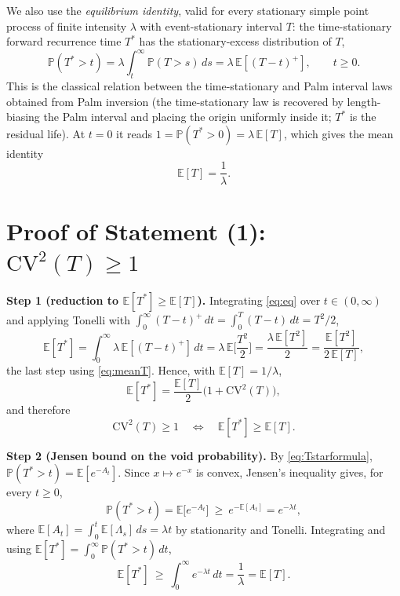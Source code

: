 \documentclass{amsart}
\theoremstyle{plain}
\theoremstyle{definition}
\newcommand{\E}{\mathbb{E}}
\newcommand{\Prob}{\mathbb{P}}
\newcommand{\Lam}{\Lambda}
\begin{document}
We also use the \emph{equilibrium identity}, valid for every stationary simple point
process of finite intensity $\lambda$ with event-stationary interval $T$: the
time-stationary forward recurrence time $T^\ast$ has the stationary-excess
distribution of $T$,
\begin{equation}\label{eq:eq}
  \Prob(T^\ast>t)=\lambda\int_t^\infty\Prob(T>s)\,ds=\lambda\,\E[(T-t)^+],
  \qquad t\ge0 .
\end{equation}
This is the classical relation between the time-stationary and Palm interval laws
obtained from Palm inversion (the time-stationary law is recovered by length-biasing
the Palm interval and placing the origin uniformly inside it; $T^\ast$ is the residual
life). At $t=0$ it reads $1=\Prob(T^\ast>0)=\lambda\,\E[T]$, which gives the mean
identity
\begin{equation}\label{eq:meanT}
  \E[T]=\frac1\lambda .
\end{equation}

\section{Proof of Statement (1): $\mathrm{CV}^2(T)\ge1$}

\noindent\textbf{Step 1 (reduction to $\E[T^\ast]\ge\E[T]$).}
Integrating \eqref{eq:eq} over $t\in(0,\infty)$ and applying Tonelli with
$\int_0^\infty(T-t)^+\,dt=\int_0^T(T-t)\,dt=T^2/2$,
\begin{equation}\label{eq:Tstar2}
  \E[T^\ast]=\int_0^\infty\lambda\,\E[(T-t)^+]\,dt
   =\lambda\,\E\Big[\frac{T^2}{2}\Big]
   =\frac{\lambda\,\E[T^2]}{2}
   =\frac{\E[T^2]}{2\,\E[T]},
\end{equation}
the last step using \eqref{eq:meanT}. Hence, with $\E[T]=1/\lambda$,
\begin{equation}\label{eq:Tstar3}
  \E[T^\ast]=\frac{\E[T]}{2}\big(1+\mathrm{CV}^2(T)\big),
\end{equation}
and therefore
\begin{equation}\label{eq:equiv}
  \mathrm{CV}^2(T)\ge1\quad\Longleftrightarrow\quad\E[T^\ast]\ge\E[T].
\end{equation}

\noindent\textbf{Step 2 (Jensen bound on the void probability).}
By \eqref{eq:Tstarformula}, $\Prob(T^\ast>t)=\E[e^{-A_t}]$. Since $x\mapsto e^{-x}$ is
convex, Jensen's inequality gives, for every $t\ge0$,
\begin{equation}\label{eq:jensen}
  \Prob(T^\ast>t)=\E\big[e^{-A_t}\big]\ \ge\ e^{-\E[A_t]}=e^{-\lambda t},
\end{equation}
where $\E[A_t]=\int_0^t\E[\Lam_s]\,ds=\lambda t$ by stationarity and Tonelli.
Integrating and using $\E[T^\ast]=\int_0^\infty\Prob(T^\ast>t)\,dt$,
\begin{equation}\label{eq:keybound}
  \E[T^\ast]\ \ge\ \int_0^\infty e^{-\lambda t}\,dt=\frac1\lambda=\E[T].
\end{equation}
\end{document}
